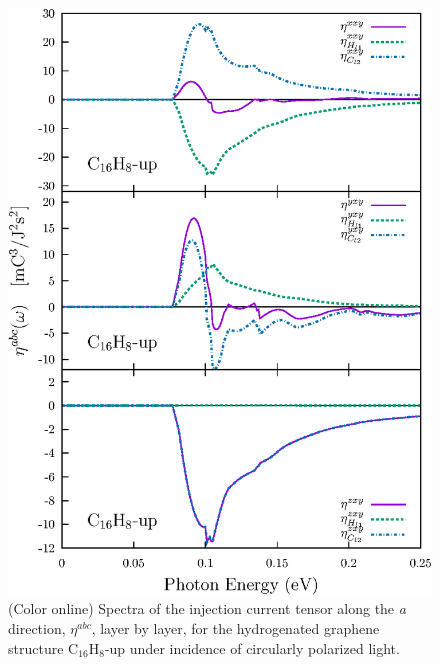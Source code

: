 \documentclass[pss]{wiley2sp} %
\begin{document}
\begin{figure}[b]
  \centering
  \includegraphics[width=\linewidth]{up/up-eta-multiplot.eps}
  \caption{(Color online) Spectra of the injection current tensor along the \emph{a} direction, {$\eta^{abc}$}, layer by layer, for the hydrogenated graphene structure C$_{16}$H$_{8}$-up under incidence of circularly polarized light.\label{fig:up-eta}}
\end{figure}
\end{document}
